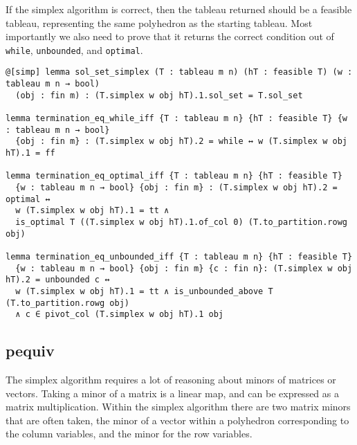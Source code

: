 \documentclass[11pt]{article} %
\begin{document}
If the simplex algorithm is correct, then the tableau returned should be a feasible tableau, representing the same polyhedron as the starting tableau. Most importantly we also need to prove that it returns the correct condition out of \lstinline|while|, \lstinline|unbounded|, and \lstinline|optimal|.

\begin{lstlisting}
@[simp] lemma sol_set_simplex (T : tableau m n) (hT : feasible T) (w : tableau m n → bool)
  (obj : fin m) : (T.simplex w obj hT).1.sol_set = T.sol_set

lemma termination_eq_while_iff {T : tableau m n} {hT : feasible T} {w : tableau m n → bool}
  {obj : fin m} : (T.simplex w obj hT).2 = while ↔ w (T.simplex w obj hT).1 = ff

lemma termination_eq_optimal_iff {T : tableau m n} {hT : feasible T}
  {w : tableau m n → bool} {obj : fin m} : (T.simplex w obj hT).2 = optimal ↔
  w (T.simplex w obj hT).1 = tt ∧
  is_optimal T ((T.simplex w obj hT).1.of_col 0) (T.to_partition.rowg obj)

lemma termination_eq_unbounded_iff {T : tableau m n} {hT : feasible T}
  {w : tableau m n → bool} {obj : fin m} {c : fin n}: (T.simplex w obj hT).2 = unbounded c ↔
  w (T.simplex w obj hT).1 = tt ∧ is_unbounded_above T (T.to_partition.rowg obj)
  ∧ c ∈ pivot_col (T.simplex w obj hT).1 obj
\end{lstlisting}

\subsection{pequiv}
The simplex algorithm requires a lot of reasoning about minors of matrices or vectors. Taking a minor of a matrix is a linear map, and can be expressed as a matrix multiplication. Within the simplex algorithm there are two matrix minors that are often taken, the minor of a vector within a polyhedron corresponding to the column variables, and the minor for the row variables.
\end{document}
